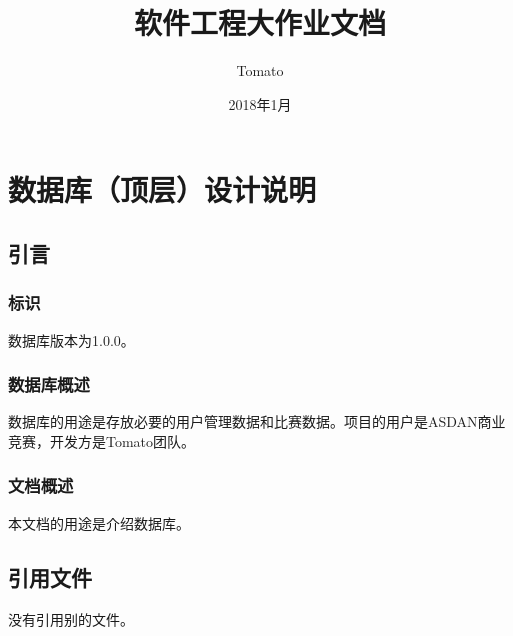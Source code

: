 \documentclass{article}
\title{软件工程大作业文档}
\author{Tomato}
\date{2018年1月}
\begin{document}
\maketitle

\section{数据库（顶层）设计说明}
\label{数据库（顶层）设计说明}
\subsection{引言}
\subsubsection{标识}
\begin{comment}
本条应包含本文档适用的数据库的完整标识，(若适用)包括标识号、标题、缩略词语、版本号、发行号。
\end{comment}
数据库版本为1.0.0。

\subsubsection{数据库概述}
\begin{comment}
本条应简述本文档适用的数据库的用途。它应描述数据库的一般性质；概括它的开发、使用和维护的历史；标识项目的投资方、需方、用户、开发方和支持机构；标识当前和计划的运行现场；并列出其他有关文档。
\end{comment}
数据库的用途是存放必要的用户管理数据和比赛数据。项目的用户是ASDAN商业竞赛，开发方是Tomato团队。

\subsubsection{文档概述}
\begin{comment}
本条应概括本文档的用途与内容，并描述与其使用有关的保密性或私密性要求。
\end{comment}
本文档的用途是介绍数据库。

\subsection{引用文件}
\begin{comment}
本章应列出本文档引用的所有文档的编号、标题、修订版本和日期。也应标识不能通过正常的供货渠道获得的所有文档的来源。
\end{comment}
没有引用别的文件。
\end{document}
